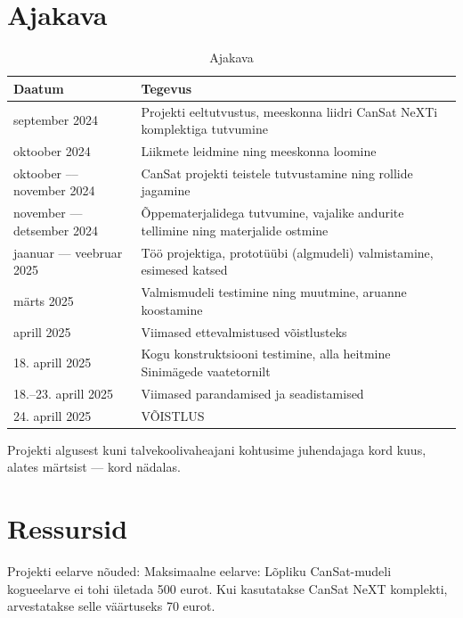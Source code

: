 \section{Ajakava}

\begin{table}[H]
    \centering
    \noindent\setlength\tabcolsep{4pt}%
    \begin{tabularx}{\linewidth}{|l|>{\RaggedRight\arraybackslash}X|}
        \hline
        \textbf{Daatum} & \textbf{Tegevus}\\
        \hline
        \hline
        september 2024 & Projekti eeltutvustus, meeskonna liidri CanSat NeXTi komplektiga tutvumine\\
        \hline
        oktoober 2024 & Liikmete leidmine ning meeskonna loomine\\
        \hline
        oktoober –-- november 2024 & CanSat projekti teistele tutvustamine ning rollide jagamine\\
        \hline
        november --- detsember 2024 & Õppematerjalidega tutvumine, vajalike andurite tellimine ning materjalide ostmine\\
        \hline
        jaanuar --- veebruar 2025 & Töö projektiga, prototüübi (algmudeli) valmistamine, esimesed katsed\\
        \hline
        märts 2025 & Valmismudeli testimine ning muutmine, aruanne koostamine\\
        \hline
        aprill 2025 & Viimased ettevalmistused võistlusteks\\
        \hline
        18. aprill 2025 & Kogu konstruktsiooni testimine, alla heitmine Sinimägede vaatetornilt\\
        \hline
        18.--23. aprill 2025 & Viimased parandamised ja seadistamised\\
        \hline
        24. aprill 2025 & VÕISTLUS\\
        \hline
    \end{tabularx}
    \caption{Ajakava}
    \label{tab:2}
\end{table}

Projekti algusest kuni talvekoolivaheajani kohtusime juhendajaga kord kuus, alates märtsist --- kord nädalas.

\section{Ressursid}

Projekti eelarve nõuded: 
Maksimaalne eelarve: Lõpliku CanSat-mudeli kogueelarve ei tohi ületada 500 eurot. Kui kasutatakse CanSat NeXT komplekti, arvestatakse selle väärtuseks 70 eurot.

